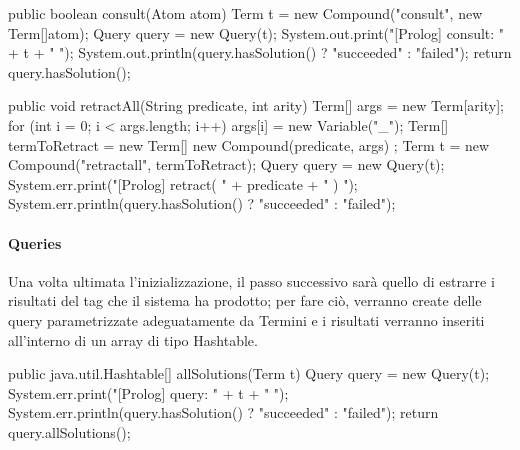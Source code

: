 \begin{javacode}
	public boolean consult(Atom atom) {
		Term t = new Compound("consult", new Term[]{atom});
		Query query = new Query(t);
		System.out.print("[Prolog] consult: " + t + " ");
		System.out.println(query.hasSolution() ? "succeeded" : "failed");
		return query.hasSolution();
	}
\end{javacode}

\begin{javacode} 
	public void retractAll(String predicate, int arity) {  
		Term[] args = new Term[arity];
		for (int i = 0; i < args.length; i++)
		args[i] = new Variable("_");
		Term[] termToRetract = new Term[]{ new Compound(predicate, args) };    
		Term t = new Compound("retractall", termToRetract);
		Query query = new Query(t);
		System.err.print("[Prolog] retract( " + predicate + " ) ");
		System.err.println(query.hasSolution() ? "succeeded" : "failed");
	}
\end{javacode}

\paragraph{Queries}
Una volta ultimata l'inizializzazione, il passo successivo sarà quello di estrarre i risultati del tag che il sistema ha prodotto; per fare ciò, verranno create delle query parametrizzate adeguatamente da Termini e i risultati verranno inseriti all'interno di un array di tipo Hashtable.

\begin{javacode}
	public java.util.Hashtable[] allSolutions(Term t) {
		Query query = new Query(t);
		System.err.print("[Prolog] query: " + t + " ");
		System.err.println(query.hasSolution() ? "succeeded" : "failed");
		return query.allSolutions();
	}
\end{javacode}